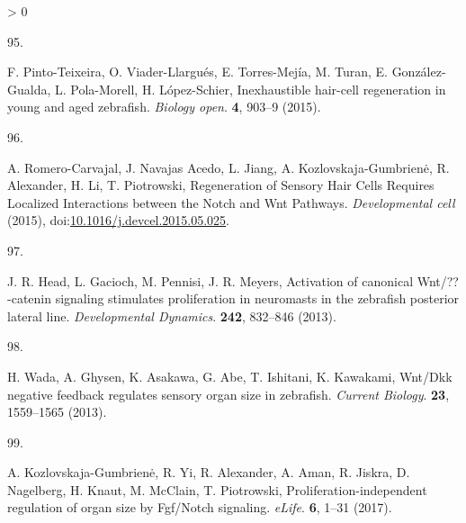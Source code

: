 \documentclass[10pt, b5paper, singlespacinge, twoside]{reedthesis} %
\newlength{\cslhangindent}
\newlength{\csllabelwidth}
\newenvironment{CSLReferences}[3] %
  {%
    \setlength{\parindent}{0pt}
    \ifodd #1 \everypar{\setlength{\hangindent}{\cslhangindent}}\ignorespaces\fi
    \ifnum #2 > 0
    \setlength{\parskip}{#2\baselineskip}
    \fi
  }%
  {}
\newcommand{\CSLLeftMargin}[1]{\parbox[t]{\maxof{\widthof{#1}}{\csllabelwidth}}{#1}}
\newcommand{\CSLRightInline}[1]{\parbox[t]{\linewidth}{#1}}
\theoremstyle{definition}
\theoremstyle{definition}
\theoremstyle{definition}
\theoremstyle{remark}
\begin{document}
\begin{CSLReferences}{0}{0}
\leavevmode\hypertarget{ref-Pinto-Teixeira2015}{}%
\CSLLeftMargin{95. }
\CSLRightInline{F. Pinto-Teixeira, O. Viader-Llargués, E. Torres-Mejía, M. Turan, E. González-Gualda, L. Pola-Morell, H. López-Schier, {Inexhaustible hair-cell regeneration in young and aged zebrafish.} \emph{Biology open}. \textbf{4}, 903--9 (2015).}

\leavevmode\hypertarget{ref-Romero-Carvajal2015}{}%
\CSLLeftMargin{96. }
\CSLRightInline{A. Romero-Carvajal, J. Navajas Acedo, L. Jiang, A. Kozlovskaja-Gumbrienė, R. Alexander, H. Li, T. Piotrowski, {Regeneration of Sensory Hair Cells Requires Localized Interactions between the Notch and Wnt Pathways.} \emph{Developmental cell} (2015), doi:\href{https://doi.org/10.1016/j.devcel.2015.05.025}{10.1016/j.devcel.2015.05.025}.}

\leavevmode\hypertarget{ref-Head2013}{}%
\CSLLeftMargin{97. }
\CSLRightInline{J. R. Head, L. Gacioch, M. Pennisi, J. R. Meyers, {Activation of canonical Wnt/??-catenin signaling stimulates proliferation in neuromasts in the zebrafish posterior lateral line}. \emph{Developmental Dynamics}. \textbf{242}, 832--846 (2013).}

\leavevmode\hypertarget{ref-Wada2013}{}%
\CSLLeftMargin{98. }
\CSLRightInline{H. Wada, A. Ghysen, K. Asakawa, G. Abe, T. Ishitani, K. Kawakami, {Wnt/Dkk negative feedback regulates sensory organ size in zebrafish}. \emph{Current Biology}. \textbf{23}, 1559--1565 (2013).}

\leavevmode\hypertarget{ref-Kozlovskaja-Gumbriene2017}{}%
\CSLLeftMargin{99. }
\CSLRightInline{A. Kozlovskaja-Gumbrienė, R. Yi, R. Alexander, A. Aman, R. Jiskra, D. Nagelberg, H. Knaut, M. McClain, T. Piotrowski, {Proliferation-independent regulation of organ size by Fgf/Notch signaling}. \emph{eLife}. \textbf{6}, 1--31 (2017).}

\end{CSLReferences}
\end{document}
